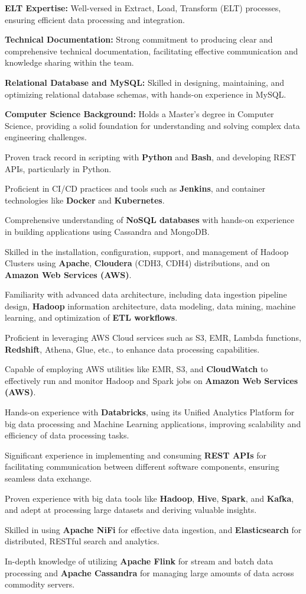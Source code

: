 \documentclass[letterpaper,11pt]{article}
\newcommand{\resumeItem}[1]{
  \item\small{
    {#1 \vspace{-2pt}}
  }
}
\begin{document}
    \item \textbf{ELT Expertise:} Well-versed in Extract, Load, Transform (ELT) processes, ensuring efficient data processing and integration. 

    \item \textbf{Technical Documentation:} Strong commitment to producing clear and comprehensive technical documentation, facilitating effective communication and knowledge sharing within the team.

    \item \textbf{Relational Database and MySQL:} Skilled in designing, maintaining, and optimizing relational database schemas, with hands-on experience in MySQL. 

    \item \textbf{Computer Science Background:} Holds a Master’s degree in Computer Science, providing a solid foundation for understanding and solving complex data engineering challenges.
    \resumeItem{Proven track record in scripting with \textbf{Python} and \textbf{Bash}, and developing REST APIs, particularly in Python.}
    \resumeItem{Proficient in CI/CD practices and tools such as \textbf{Jenkins}, and container technologies like \textbf{Docker} and \textbf{Kubernetes}.}
    

\resumeItem{Comprehensive understanding of \textbf{NoSQL databases} with hands-on experience in building applications using Cassandra and MongoDB.}
\resumeItem{Skilled in the installation, configuration, support, and management of Hadoop Clusters using \textbf{Apache}, \textbf{Cloudera} (CDH3, CDH4) distributions, and on \textbf{Amazon Web Services (AWS)}.}
\resumeItem{Familiarity with advanced data architecture, including data ingestion pipeline design, \textbf{Hadoop} information architecture, data modeling, data mining, machine learning, and optimization of \textbf{ETL workflows}.}
\resumeItem{Proficient in leveraging AWS Cloud services such as S3, EMR, Lambda functions, \textbf{Redshift}, Athena, Glue, etc., to enhance data processing capabilities.}
\resumeItem{Capable of employing AWS utilities like EMR, S3, and \textbf{CloudWatch} to effectively run and monitor Hadoop and Spark jobs on \textbf{Amazon Web Services (AWS)}.}

\resumeItem{Hands-on experience with \textbf{Databricks}, using its Unified Analytics Platform for big data processing and Machine Learning applications, improving scalability and efficiency of data processing tasks.}
\resumeItem{Significant experience in implementing and consuming \textbf{REST APIs} for facilitating communication between different software components, ensuring seamless data exchange.}
\resumeItem{Proven experience with big data tools like \textbf{Hadoop}, \textbf{Hive}, \textbf{Spark}, and \textbf{Kafka}, and adept at processing large datasets and deriving valuable insights.}
\resumeItem{Skilled in using \textbf{Apache NiFi} for effective data ingestion, and \textbf{Elasticsearch} for distributed, RESTful search and analytics.}
\resumeItem{In-depth knowledge of utilizing \textbf{Apache Flink} for stream and batch data processing and \textbf{Apache Cassandra} for managing large amounts of data across commodity servers.}
\end{document}
